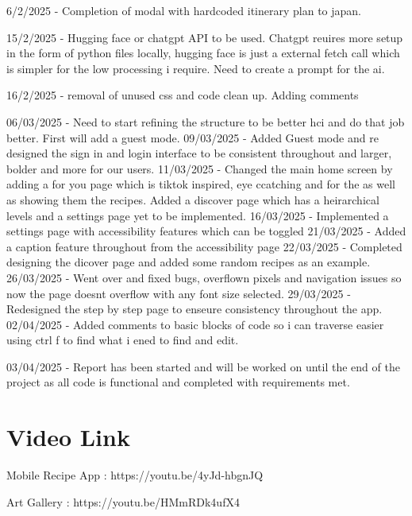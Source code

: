 \documentclass[]{project_final}
\begin{document}
6/2/2025  - Completion of modal with hardcoded itinerary plan to japan.

15/2/2025 - Hugging face or chatgpt API to be used.
Chatgpt reuires more setup in the form of python files locally, hugging face is just a external fetch call which is simpler for the low processing i require.
Need to create a prompt for the ai.

16/2/2025 - removal of unused css and code clean up. Adding comments

06/03/2025 - Need to start refining the structure to be better hci and do that job better.
First will add a guest mode.
09/03/2025 - Added Guest mode and re designed the sign in and login interface to be consistent throughout and larger, bolder and more for our users.
11/03/2025 - Changed the main home screen by adding a for you page which is tiktok inspired, eye ccatching and for the as well as showing them the recipes. Added a discover page which has a heirarchical levels and a settings page yet to be implemented.
16/03/2025 - Implemented a settings page with accessibility features which can be toggled
21/03/2025 - Added a caption feature throughout from the accessibility page
22/03/2025 - Completed designing the dicover page and added some random recipes as an example.
26/03/2025 - Went over and fixed bugs, overflown pixels and navigation issues so now the page doesnt overflow with any font size selected.
29/03/2025 - Redesigned the step by step page to enseure consistency throughout the app.
02/04/2025 - Added comments to basic blocks of code so i can traverse easier using ctrl f to find what i ened to find and edit.

03/04/2025 - Report has been started and will be worked on until the end of the project as all code is functional and completed with requirements met.

\section{Video Link}

Mobile Recipe App : https://youtu.be/4yJd-hbgnJQ

Art Gallery : https://youtu.be/HMmRDk4ufX4
\end{document}
